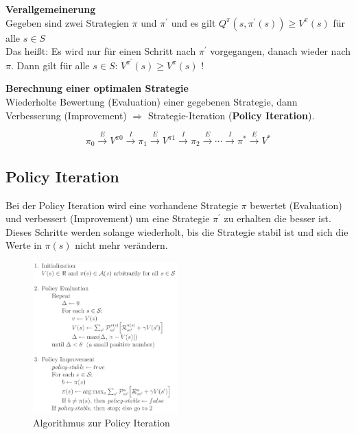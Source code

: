 \documentclass[10pt]{scrartcl}
\begin{document}
\textbf{Verallgemeinerung}\\
Gegeben sind zwei Strategien $\pi$ und $\pi^{'}$ und es gilt $Q^{\pi}(s,\pi^{'}(s)) \geq V^{\pi}(s)$ für alle $s \in S$\\
Das heißt: Es wird nur für einen Schritt nach  $\pi^{'}$ vorgegangen, danach wieder nach  $\pi$. Dann gilt für alle $s \in S$: $V^{\pi^{'}}(s) \geq V^{\pi}(s)$ !

\textbf{Berechnung einer optimalen Strategie}\\
Wiederholte Bewertung (Evaluation) einer gegebenen Strategie, dann Verbesserung (Improvement) $\Rightarrow$ Strategie-Iteration (\textbf{Policy Iteration}).

\begin{equation}
\pi_{0} \overset{E}\rightarrow V^{\pi 0} \overset{I}\rightarrow \pi_{1} \overset{E}\rightarrow V^{\pi 1} \overset{I}\rightarrow \pi_{2} \overset{E}\rightarrow \dotsb \overset{I}\rightarrow \pi^{*} \overset{E}\rightarrow V^{*}
\end{equation}

\subsection{Policy Iteration}
Bei der Policy Iteration wird eine vorhandene Strategie $\pi$ bewertet (Evaluation) und verbessert (Improvement) um eine Strategie $\pi^{'}$ zu erhalten die besser ist. Dieses Schritte werden solange wiederholt, bis die Strategie stabil  ist und sich die Werte in $\pi(s)$ nicht mehr verändern.

\begin{figure}[htbp]
	\centering	\includegraphics[width=0.5\textwidth]{Bilder/Policy.png}
	\caption{Algorithmus zur Policy Iteration}
	\label{fig:Policy}
\end{figure}
\end{document}

